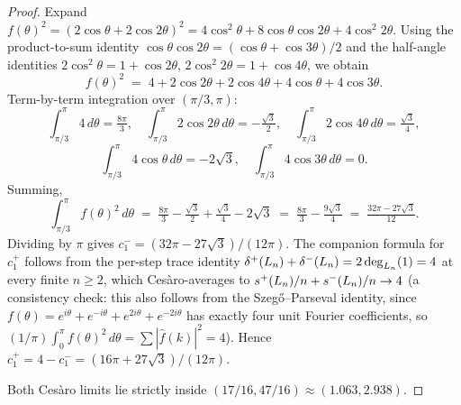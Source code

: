 \begin{proof}
Expand $f(\theta)^{2} = (2\cos\theta + 2\cos 2\theta)^{2}
= 4\cos^{2}\theta + 8\cos\theta\cos 2\theta + 4\cos^{2}2\theta$.
Using the product-to-sum identity
$\cos\theta \cos 2\theta = (\cos\theta + \cos 3\theta)/2$ and the
half-angle identities $2\cos^{2}\theta = 1 + \cos 2\theta$,
$2\cos^{2} 2\theta = 1 + \cos 4\theta$, we obtain
\[
f(\theta)^{2} \;=\; 4 + 2\cos 2\theta + 2\cos 4\theta + 4\cos\theta + 4\cos 3\theta.
\]
Term-by-term integration over $(\pi/3, \pi)$:
\[
\int_{\pi/3}^{\pi} 4\, d\theta = \tfrac{8\pi}{3}, \quad
\int_{\pi/3}^{\pi} 2\cos 2\theta\, d\theta = -\tfrac{\sqrt{3}}{2}, \quad
\int_{\pi/3}^{\pi} 2\cos 4\theta\, d\theta = \tfrac{\sqrt{3}}{4},
\]
\[
\int_{\pi/3}^{\pi} 4\cos\theta\, d\theta = -2\sqrt{3}, \quad
\int_{\pi/3}^{\pi} 4\cos 3\theta\, d\theta = 0.
\]
Summing,
\[
\int_{\pi/3}^{\pi} f(\theta)^{2}\, d\theta
\;=\; \tfrac{8\pi}{3} - \tfrac{\sqrt{3}}{2} + \tfrac{\sqrt{3}}{4} - 2\sqrt{3}
\;=\; \tfrac{8\pi}{3} - \tfrac{9\sqrt{3}}{4}
\;=\; \tfrac{32\pi - 27\sqrt{3}}{12}.
\]
Dividing by $\pi$ gives $c_{1}^{-} = (32\pi - 27\sqrt{3})/(12\pi)$.
The companion formula for $c_{1}^{+}$ follows from the per-step trace
identity $\delta^{+}(L_{n}) + \delta^{-}(L_{n}) = 2\deg_{L_{n}}(1) = 4$ at every
finite $n \ge 2$, which Ces\`aro-averages to
$s^{+}(L_{n})/n + s^{-}(L_{n})/n \to 4$ (a consistency check: this
also follows from the Szeg\H{o}--Parseval identity, since
$f(\theta) = e^{i\theta} + e^{-i\theta} + e^{2i\theta} + e^{-2i\theta}$
has exactly four unit Fourier coefficients, so
$(1/\pi) \int_{0}^{\pi} f(\theta)^{2}\, d\theta = \sum |\hat{f}(k)|^{2} = 4$).
Hence $c_{1}^{+} = 4 - c_{1}^{-} = (16\pi + 27\sqrt{3})/(12\pi)$.

Both Ces\`aro limits lie strictly inside $(17/16, 47/16) \approx (1.063, 2.938)$.
\end{proof}

